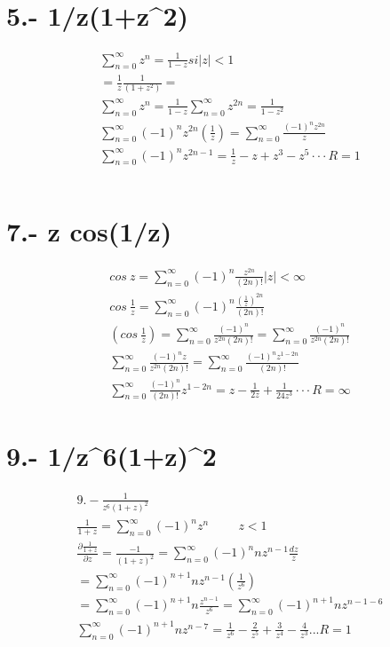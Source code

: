 \documentclass{article}
\begin{document}
\section*{5.- 1/z(1+z^2) }
\begin{align*}
\sum_{n=0}^\infty z^n = \frac{1}{1-z} si |z|<1 \\
 = \frac{1}{z} \frac{1}{(1+z^2)} = \\
 \sum_{n=0}^\infty z^n = \frac{1}{1-z} \sum_{n=0}^\infty z^{2n} = \frac{1}{1-z^2} \\
 \sum_{n=0}^\infty (-1)^nz^{2n} (\frac{1}{z}) = \sum_{n=0}^\infty \frac{(-1)^nz^{2n}}{z} \\
 \sum_{n=0}^\infty (-1)^nz^{2n-1} = \frac{1}{z} -z +z^3 -z^5 \cdot\cdot\cdot R=1 \\
 \\
\end{align*}
\section*{7.- z cos(1/z) }
\begin{align*}
cos~z=\sum_{n=0}^\infty (-1)^{n}\frac{z^{2n}}{(2n)!} |z|<\infty \\
 cos~\frac{1}{z}=\sum_{n=0}^\infty (-1)^{n}\frac{(\frac{1}{z})^{2n}}{(2n)!} \\
 (cos~\frac{1}{z})=\sum_{n=0}^\infty \frac{(-1)^{n}}{z^{2n}(2n)!}=\sum_{n=0}^\infty \frac{(-1)^{n}}{z^{2n}(2n)!} \\
 \sum_{n=0}^\infty \frac{(-1)^{n}z}{z^{2n}(2n)!}=\sum_{n=0}^\infty \frac{(-1)^{n}z^{1-2n}}{(2n)!} \\
 \sum_{n=0}^\infty \frac{(-1)^{n}}{(2n)!}z^{1-2n}=z-\frac{1}{2z}+\frac{1}{24z^{3}}\cdot\cdot\cdot R=\infty
\end{align*}
\section*{9.- 1/z^6(1+z)^2}
\begin{align*}
9.- \frac{1}{z^6(1+z)^2} \\
\frac{1}{1+z} = \sum_{n=0}^\infty (-1)^n z^n \hspace{1cm} z<1 \\
\frac{\partial \frac{1}{1+z}}{\partial z} = \frac{-1}{(1+z)^2} = \sum_{n=0}^\infty (-1)^n nz^{n-1} \frac{dz}{z} \\
= \sum_{n=0}^\infty (-1)^{n+1} n z^{n-1} (\frac{1}{z^6}) \\
= \sum_{n=0}^\infty (-1)^{n+1} n \frac{z^{n-1}}{z^6} = \sum_{n=0}^\infty (-1)^{n+1} nz^{n-1-6} \\
\sum_{n=0}^\infty (-1)^{n+1} nz^{n-7} = \frac{1}{z^6} - \frac{2}{z^5} + \frac{3}{z^4} - \frac{4}{z^3} ... R=1
\end{align*}
\end{document}
